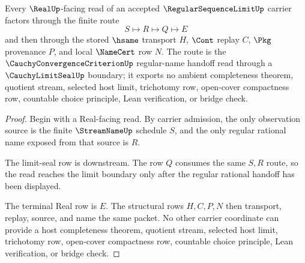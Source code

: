 \begin{theorem}
\label{thm:regular-sequence-limit-window-seal-handoff}
Every $\RealUp$-facing read of an accepted $\RegularSequenceLimitUp$ carrier factors through the finite route
$$
S \longmapsto R \longmapsto Q \longmapsto E
$$
and then through the stored $\hsame$ transport $H$, $\Cont$ replay $C$, $\Pkg$ provenance $P$, and local $\NameCert$ row $N$. The route is the $\CauchyConvergenceCriterionUp$ regular-name handoff read through a $\CauchyLimitSealUp$ boundary; it exports no ambient completeness theorem, quotient stream, selected host limit, trichotomy row, open-cover compactness row, countable choice principle, Lean verification, or bridge check.
\end{theorem}
\begin{proof}
Begin with a Real-facing read. By carrier admission, the only observation source is the finite $\StreamNameUp$ schedule $S$, and the only regular rational name exposed from that source is $R$.

The limit-seal row is downstream. The row $Q$ consumes the same $S,R$ route, so the read reaches the limit boundary only after the regular rational handoff has been displayed.

The terminal Real row is $E$. The structural rows $H,C,P,N$ then transport, replay, source, and name the same packet. No other carrier coordinate can provide a host completeness theorem, quotient stream, selected host limit, trichotomy row, open-cover compactness row, countable choice principle, Lean verification, or bridge check.
\end{proof}

